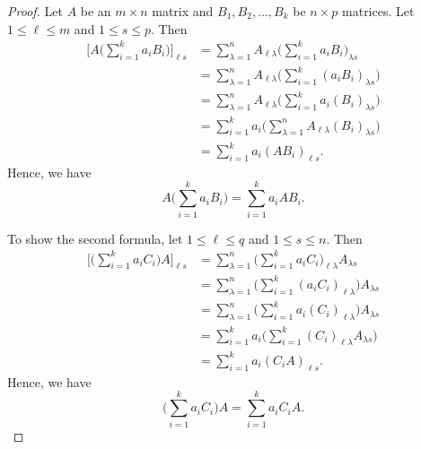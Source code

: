 \begin{proof}
Let \( A  \) be an \( m \times n  \) matrix and \( {B}_{1}, {B}_{2}, \dots, {B}_{k } \) be \( n \times p  \) matrices. Let \( 1 \leq \ell \leq m  \) and \( 1 \leq s  \leq p  \). Then
\begin{align*}
    \Big[ A \Big( \sum_{ i=1 }^{ k  } {a}_{i} {B}_{i} \Big) \Big]_{\ell s } &= \sum_{ \lambda = 1  }^{ n } {A}_{ \ell \lambda }  \Big( \sum_{ i=1 }^{ k  } {a}_{i} {B}_{i} \Big)_{\lambda s }  \\
                                                                        &= \sum_{ \lambda = 1  }^{ n  } {A}_{ \ell \lambda } \Big(  \sum_{ i=1  }^{  k  } {({a}_{i} {B}_{i})}_{\lambda s } \Big)  \\
                                                                        &=  \sum_{ \lambda = 1  }^{ n  } {A}_{ \ell \lambda } \Big( \sum_{ i=1 }^{ k  } {a}_{i} ({B}_{i})_{\lambda s } \Big) \\
                                                                        &= \sum_{ i=1  }^{ k  } {a}_{i} \Big( \sum_{ \lambda =1  }^{ n  } {A}_{ \ell \lambda } ({B}_{i})_{\lambda s } \Big) \tag{part (a) of Theorem 2.12}  \\
                                                                        &= \sum_{ i=1  }^{ k  } {a}_{i}  (A {B}_{i})_{\ell s } .
\end{align*}
Hence, we have
\[  A \Big( \sum_{ i=1 }^{ k  } {a}_{i} {B}_{i}  \Big) = \sum_{ i=1  }^{  k  } {a}_{i} {AB}_{i}.\]

To show the second formula, let \( 1 \leq \ell \leq q  \) and \( 1 \leq  s  \leq n   \). Then
\begin{align*}
    \Big[ \Big( \sum_{ i=1 }^{ k  } {a}_{i} {C}_{i}  \Big) A  \Big]_{\ell s }  &= \sum_{ \lambda = 1  }^{ n   } \Big( \sum_{ i=1 }^{ k  } {a}_{i} {C}_{i} \Big)_{\ell \lambda } {A}_{\lambda s }  \\
                                                                                     &= \sum_{ \lambda = 1  }^{ n } \Big( \sum_{ i=1 }^{  k   } ({a}_{i} {C}_{i})_{\ell \lambda }  \Big) {A}_{\lambda s } \\
                                                                                     &= \sum_{ \lambda = 1  }^{ n } \Big( \sum_{ i=1 }^{  k   } {a}_{i} ({C}_{i})_{\ell \lambda }  \Big) {A}_{\lambda s } \\
                                                                                     &= \sum_{ i =1  }^{ k  } {a}_{i} \Big( \sum_{ i=1  }^{ k  } {({C}_{i})}_{\ell \lambda } {A}_{\lambda s }  \Big) \tag{part (a) of Theorem 2.12}   \\
                                                                                     &= \sum_{ i=1  }^{ k  } {a}_{i} ({C}_{i} A  )_{\ell s }.
\end{align*}
Hence, we have
\[  \Big( \sum_{ i=1  }^{  k  } {a}_{i} {C}_{i}  \Big) A = \sum_{ i=1  }^{ k  } {a}_{i} {C}_{i} A. \]
\end{proof}



